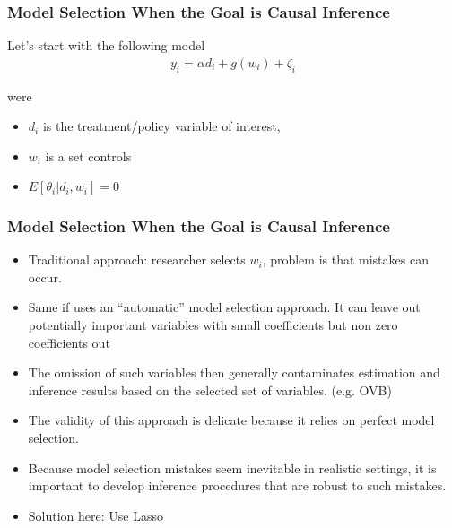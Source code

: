 \documentclass[
  shownotes,
  xcolor={svgnames},
  hyperref={colorlinks,citecolor=DarkBlue,linkcolor=DarkRed,urlcolor=DarkBlue}
  , aspectratio=169]{beamer}
\begin{document}
\begin{frame}[fragile]
\frametitle{Model Selection When the Goal is Causal Inference}

Let's start with the following model
\medskip
\begin{align}
  y_i = \alpha d_i + g(w_i) + \zeta_i
\end{align}

\medskip

were 

\begin{itemize}
\item $d_i$ is the treatment/policy variable of interest, 
\item $w_i$ is a set controls
\item $E[\theta_i|d_i,w_i]=0$
\end{itemize}
\end{frame}

\begin{frame}[fragile]
\frametitle{Model Selection When the Goal is Causal Inference}
\begin{itemize}
  \item Traditional approach: researcher selects $w_i$, problem is that mistakes can occur.
  \medskip
  \item Same if uses an ``automatic'' model selection approach. It can leave out potentially important variables with small coefficients but non zero coefficients out
  \medskip
  \item The omission of such variables then generally contaminates estimation and inference results based on the selected set of variables. (e.g. OVB)
  \medskip
  \item The validity of this approach is delicate because it relies on perfect model selection.
  \medskip
  \item Because model selection mistakes seem inevitable in realistic settings, it is important to develop inference procedures that are robust to such mistakes.
  \medskip
  \item Solution here: Use Lasso
\end{itemize}


\end{frame}
\end{document}
